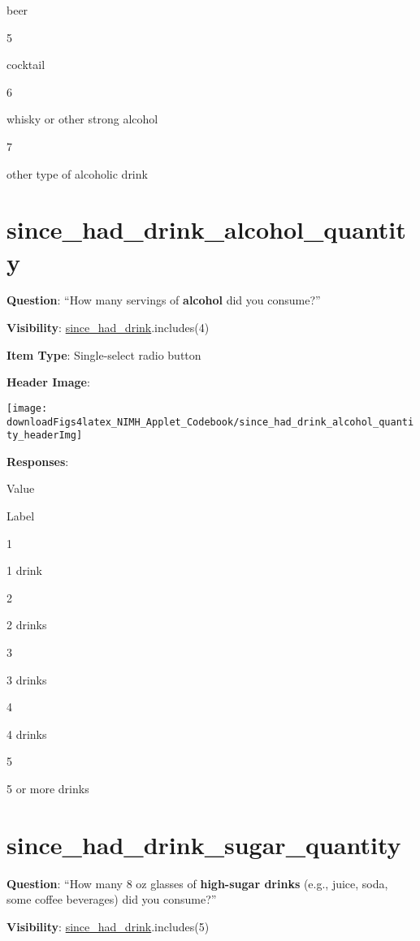 \documentclass[]{book}
\begin{document}
beer

5

cocktail

6

whisky or other strong alcohol

7

other type of alcoholic drink

\hypertarget{since_had_drink_alcohol_quantity}{%
\section{since\_had\_drink\_alcohol\_quantity}\label{since_had_drink_alcohol_quantity}}

\textbf{Question}: ``How many servings of \textbf{alcohol} did you consume?''

\textbf{Visibility}: \protect\hyperlink{since_had_drink}{since\_had\_drink}.includes(4)

\textbf{Item Type}: Single-select radio button

\textbf{Header Image}:

\begin{flushleft}\texttt{[image: downloadFigs4latex\_NIMH\_Applet\_Codebook/since\_had\_drink\_alcohol\_quantity\_headerImg]} \end{flushleft}

\textbf{Responses}:

Value

Label

1

1 drink

2

2 drinks

3

3 drinks

4

4 drinks

5

5 or more drinks

\hypertarget{since_had_drink_sugar_quantity}{%
\section{since\_had\_drink\_sugar\_quantity}\label{since_had_drink_sugar_quantity}}

\textbf{Question}: ``How many 8 oz glasses of \textbf{high-sugar drinks} (e.g., juice, soda, some coffee beverages) did you consume?''

\textbf{Visibility}: \protect\hyperlink{since_had_drink}{since\_had\_drink}.includes(5)
\end{document}
